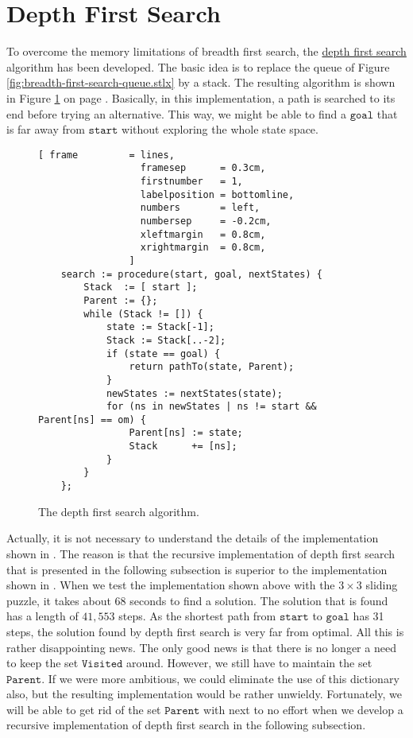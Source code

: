 \section{Depth First Search}
To overcome the memory limitations of breadth first search, the
\href{https://en.wikipedia.org/wiki/Depth-first_search}{depth first search} algorithm has been
developed.  The basic idea is to replace the queue of Figure
\ref{fig:breadth-first-search-queue.stlx} by a stack.  The resulting algorithm is shown in Figure
\ref{fig:depth-first-search.stlx} on page \pageref{fig:depth-first-search.stlx}.  Basically, in this
implementation, a path is searched to its end before trying an alternative.  This way, we might be able to find a
$\mathtt{goal}$ that is far away from $\mathtt{start}$ without exploring the whole state space.  

\begin{figure}[!ht]
\centering
\begin{Verbatim}[ frame         = lines, 
                  framesep      = 0.3cm, 
                  firstnumber   = 1,
                  labelposition = bottomline,
                  numbers       = left,
                  numbersep     = -0.2cm,
                  xleftmargin   = 0.8cm,
                  xrightmargin  = 0.8cm,
                ]
    search := procedure(start, goal, nextStates) {
        Stack  := [ start ];
        Parent := {};
        while (Stack != []) {
            state := Stack[-1];
            Stack := Stack[..-2];
            if (state == goal) {
                return pathTo(state, Parent);
            }
            newStates := nextStates(state);
            for (ns in newStates | ns != start && Parent[ns] == om) { 
                Parent[ns] := state;
                Stack      += [ns];
            }
        }
    };
\end{Verbatim}
\vspace*{-0.3cm}
\caption{The depth first search algorithm.}
\label{fig:depth-first-search.stlx}
\end{figure}
Actually, it is not necessary to understand the details of the implementation shown in
.  The reason is that the recursive implementation of depth first
search that is presented in the following subsection is superior to the implementation shown in
.
When we test the implementation shown above with the $3 \times 3$ sliding puzzle, it takes about 68 seconds to find a solution.  
The solution that is found has a length of $41,553$ steps.  As the
shortest path from $\mathtt{start}$ to $\mathtt{goal}$ has 31 steps, the solution found by depth
first search is very far from optimal.  All this is rather disappointing news.  The only good news
is that there is no longer a need to keep the set $\mathtt{Visited}$ around.  However, we still have
to maintain the set $\mathtt{Parent}$.  If we were more ambitious, we could eliminate the use of
this dictionary also, but the resulting implementation would be rather unwieldy.  Fortunately, we will be
able to get rid of the set $\mathtt{Parent}$ with next to no effort when we develop a recursive
implementation of depth first search in the following subsection.

